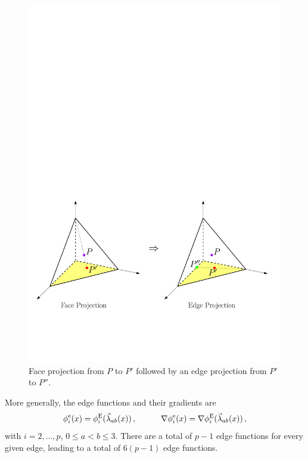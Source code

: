 \begin{figure}[!ht]
\begin{center}
\includegraphics[scale=0.6]{./figures/TetProjection.pdf}
\caption{Face projection from $P$ to $P'$ followed by an edge projection from $P'$ to $P''$.}
\label{fig:TetProjection}
\end{center}
\end{figure}

More generally, the edge functions and their gradients are
\begin{equation}
	\phi_i^\mathrm{e}(x)=\phi_i^{\mathrm{E}}(\vec{\lambda}_{ab}(x))\,,\qquad\quad
		\nabla\phi_i^\mathrm{e}(x)=\nabla\phi_i^{\mathrm{E}}(\vec{\lambda}_{ab}(x))\,,
	\label{eq:Tetphigeneral}
\end{equation}
with $i=2,\ldots,p$, $0\leq a<b\leq3$. 
There are a total of $p-1$ edge functions for every given edge, leading to a total of $6(p-1)$ edge functions.

